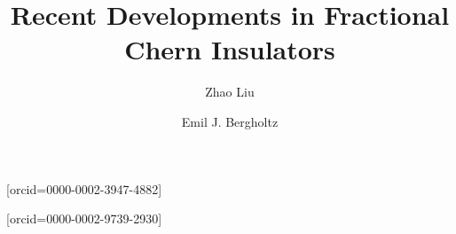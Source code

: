 \documentclass[a4paper,fleqn]{cas-sc}
\begin{document}
\let\WriteBookmarks\relax
\def\floatpagepagefraction{1}
\def\textpagefraction{.001}

\title[mode = title]{Recent Developments in Fractional Chern Insulators}




  \author[1]{Zhao Liu}[orcid=0000-0002-3947-4882]
  \cormark[1] 


  \address[1]{Zhejiang Institute of Modern Physics, Zhejiang University, Hangzhou 310027, China}

  \author[2]{Emil J. Bergholtz}[orcid=0000-0002-9739-2930]

  \address[2]{Department of Physics, Stockholm University, AlbaNova University Center, 106 91 Stockholm, Sweden}




\end{document}
